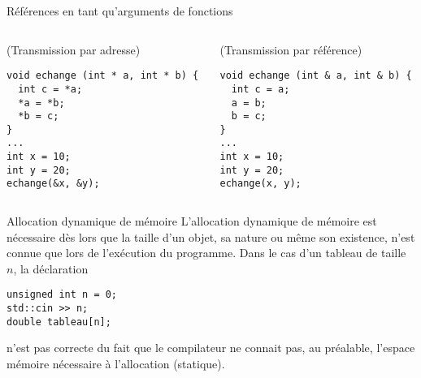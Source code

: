 \documentclass[c]{beamer}
\begin{document}
\begin{frame}[fragile]{Références en tant qu'arguments de fonctions}
 \begin{columns}
\begin{column}{0.5\columnwidth}
\begin{cbox}[][lwuc](Transmission par adresse)
\begin{verbatim}
void echange (int * a, int * b) {
  int c = *a;
  *a = *b;
  *b = c;
}
...
int x = 10;
int y = 20;
echange(&x, &y);
\end{verbatim}

\pause
\end{cbox}
\end{column}

\begin{column}{0.5\columnwidth}
\begin{cbox}[][lwuc](Transmission par référence)
\begin{verbatim}
void echange (int & a, int & b) {
  int c = a;
  a = b;
  b = c;
}
...
int x = 10;
int y = 20;
echange(x, y);
\end{verbatim}
\end{cbox}
\end{column}
\end{columns}
\end{frame}



\begin{frame}[fragile]{Allocation dynamique de mémoire}
L'allocation dynamique de mémoire est nécessaire dès lors que la taille d'un objet, sa nature ou même son existence, n'est connue que lors de l'exécution du programme. Dans le cas d'un tableau de taille $n$, la déclaration

\begin{verbatim}
unsigned int n = 0;
std::cin >> n;
double tableau[n];
\end{verbatim}

n'est pas correcte du fait que le compilateur ne connait pas, au préalable, l'espace
mémoire nécessaire à l'allocation (statique).
\end{frame}

\end{document}

